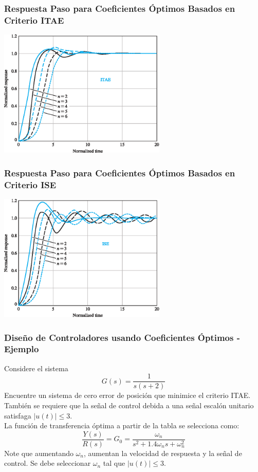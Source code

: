 \documentclass[aspectratio=169,handout]{beamer}
\theoremstyle{definition}
\theoremstyle{plain}
\theoremstyle{remark}
\begin{document}
\begin{frame}[c]\frametitle{Respuesta Paso para Coeficientes Óptimos Basados en Criterio ITAE}
\vspace*{5mm}
\centering
\includegraphics[width=8cm]{images/stepResponseOptimITAE.eps}
\end{frame}

\begin{frame}[c]\frametitle{Respuesta Paso para Coeficientes Óptimos Basados en Criterio ISE}
\vspace*{5mm}
\centering
\includegraphics[width=8cm]{images/stepResponseOptimISE.eps}
\end{frame}

\begin{frame}[<+->]\frametitle{Diseño de Controladores usando Coeficientes Óptimos - Ejemplo}
Considere el sistema
\begin{equation*}
	G(s) = \frac{1}{s(s+2)}
\end{equation*}
Encuentre un sistema de cero error de posición que minimice el criterio ITAE. También se requiere que la señal de control debida a una señal escalón unitario satisfaga $|u(t)| \leq 3$.\\
\vspace*{3mm}
La función de transferencia óptima a partir de la tabla se selecciona como:
\begin{equation*}
	\frac{Y(s)}{R(s)} = G_0 = \frac{\omega_n}{s^2 + 1.4 \omega_n s + \omega_n^2}
\end{equation*}
Note que aumentando $\omega_n$, aumentan la velocidad de respuesta y la señal de control. Se debe seleccionar $\omega_n$ tal que $|u(t)| \leq 3$.
\end{frame}
\end{document}
